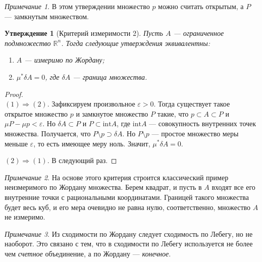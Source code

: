 \documentclass[a4paper,12pt]{article}
\theoremstyle{remark}
\newtheorem*{Comment}{Примечание}
\theoremstyle{definition}
\theoremstyle{plain}
\newtheorem*{Statement}{Утверждение}
\newcommand{\0}{\vec{0}}
\newcommand{\eps}{\varepsilon}
\newcommand{\R}{\mathbb{R}}
\begin{document}
\begin{Comment}
В этом утверждении множество $p$ можно считать открытым, а $P$ --- замкнутым множеством.
\end{Comment}

\begin{Statement}[Критерий измеримости 2]
Пусть $A$ --- ограниченное подмножество $\R^n$. Тогда следующие утверждения эквивалентны:
\begin{enumerate}
\item $A$ --- измеримо по Жордану;
\item $\mu^* \delta A = 0$, где $\delta A$ --- граница множества.
\end{enumerate}
\end{Statement}
\begin{proof}\ \\
$(1) \Rightarrow (2)$. Зафиксируем произвольное $\eps > 0$. Тогда существует такое открытое множество $p$ и замкнутое множество $P$ такие, что $p \subset A \subset P$ и $\mu P- \mu p < \eps$. Но $\delta A \subset P$ и $P \subset \mathrm{int} A$, где $\mathrm{int} A$ --- совокупность внутренних точек множества. Получается, что $P \setminus p \supset \delta A$. Но $P \setminus p$ --- простое множество меры меньше $\eps$, то есть имеющее меру ноль. Значит, $\mu^* \delta A = 0$.

$(2) \Rightarrow (1)$. В следующий раз.
\end{proof}

\begin{Comment}
На основе этого критерия строится классический пример неизмеримого по Жордану множества. Берем квадрат, и пусть в $A$ входят все его внутренние точки с рациональными координатами. Границей такого множества будет весь куб, и его мера очевидно не равна нулю, соответственно, множество $A$ не измеримо.
\end{Comment}
\begin{Comment}
Из сходимости по Жордану следует сходимость по Лебегу, но не наоборот. Это связано с тем, что в сходимости по Лебегу используется не более чем \textit{счетное} объединение, а по Жордану --- \textit{конечное}.
\end{Comment}
\end{document}
